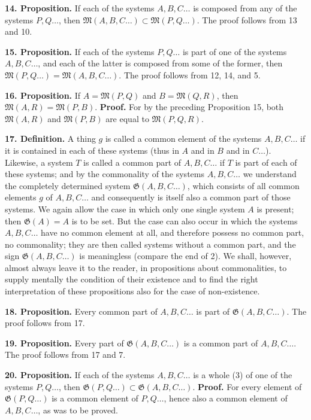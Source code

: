 \documentclass[11pt]{article}
\newcommand{\Mf}{\mathfrak{M}}
\newcommand{\Gf}{\mathfrak{G}}
\newcommand{\partof}{\mathrel{\subset}}
\begin{document}
\noindent\textbf{14. Proposition.} If each of the systems $A,B,C\ldots$ is composed from any of the systems $P,Q\ldots$, then $\Mf(A,B,C\ldots)\partof\Mf(P,Q\ldots)$. The proof follows from 13 and 10.

\noindent\textbf{15. Proposition.} If each of the systems $P,Q\ldots$ is part of one of the systems $A,B,C\ldots$, and each of the latter is composed from some of the former, then $\Mf(P,Q\ldots)=\Mf(A,B,C\ldots)$. The proof follows from 12, 14, and 5.

\noindent\textbf{16. Proposition.} If $A=\Mf(P,Q)$ and $B=\Mf(Q,R)$, then $\Mf(A,R)=\Mf(P,B)$. \textbf{Proof.} For by the preceding Proposition 15, both $\Mf(A,R)$ and $\Mf(P,B)$ are equal to $\Mf(P,Q,R)$.

\noindent\textbf{17. Definition.} A thing $g$ is called a common element of the systems $A,B,C\ldots$ if it is contained in each of these systems (thus in $A$ and in $B$ and in $C\ldots$). Likewise, a system $T$ is called a common part of $A,B,C\ldots$ if $T$ is part of each of these systems; and by the commonality of the systems $A,B,C\ldots$ we understand the completely determined system $\Gf(A,B,C\ldots)$, which consists of all common elements $g$ of $A,B,C\ldots$ and consequently is itself also a common part of those systems. We again allow the case in which only one single system $A$ is present; then $\Gf(A)=A$ is to be set. But the case can also occur in which the systems $A,B,C\ldots$ have no common element at all, and therefore possess no common part, no commonality; they are then called systems without a common part, and the sign $\Gf(A,B,C\ldots)$ is meaningless (compare the end of 2). We shall, however, almost always leave it to the reader, in propositions about commonalities, to supply mentally the condition of their existence and to find the right interpretation of these propositions also for the case of non-existence.

\noindent\textbf{18. Proposition.} Every common part of $A,B,C\ldots$ is part of $\Gf(A,B,C\ldots)$. The proof follows from 17.

\noindent\textbf{19. Proposition.} Every part of $\Gf(A,B,C\ldots)$ is a common part of $A,B,C\ldots$. The proof follows from 17 and 7.

\noindent\textbf{20. Proposition.} If each of the systems $A,B,C\ldots$ is a whole (3) of one of the systems $P,Q\ldots$, then $\Gf(P,Q\ldots)\partof\Gf(A,B,C\ldots)$. \textbf{Proof.} For every element of $\Gf(P,Q\ldots)$ is a common element of $P,Q\ldots$, hence also a common element of $A,B,C\ldots$, as was to be proved.
\end{document}
